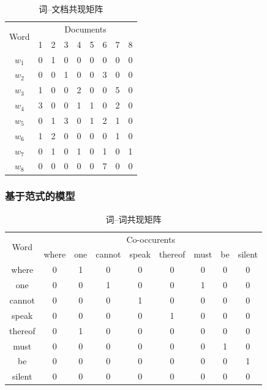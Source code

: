 \begin{table}
  \setlength{\tabcolsep}{8pt}
  \centering
  \caption{词--文档共现矩阵\cite{Sahlgren2008}}
  \label{tab:word-doc}
  \begin{tabular}{|c|cccccccc|}
    \hline
    \multirow{2}{*}{Word} & \multicolumn{8}{c|}{Documents} \\
                          & 1 & 2 & 3 & 4 & 5 & 6 & 7 & 8  \\
    \hline
    $w_1$ & 0 & 1 & 0 & 0 & 0 & 0 & 0 & 0  \\
    $w_2$ & 0 & 0 & 1 & 0 & 0 & 3 & 0 & 0  \\
    $w_3$ & 1 & 0 & 0 & 2 & 0 & 0 & 5 & 0  \\
    $w_4$ & 3 & 0 & 0 & 1 & 1 & 0 & 2 & 0  \\
    $w_5$ & 0 & 1 & 3 & 0 & 1 & 2 & 1 & 0  \\
    $w_6$ & 1 & 2 & 0 & 0 & 0 & 0 & 1 & 0  \\
    $w_7$ & 0 & 1 & 0 & 1 & 0 & 1 & 0 & 1  \\
    $w_8$ & 0 & 0 & 0 & 0 & 0 & 7 & 0 & 0  \\
    \hline
  \end{tabular}
\end{table}

\subsubsection{基于范式的模型}
\begin{table}
  \centering
  \caption{词--词共现矩阵\cite{Sahlgren2008}}
  \label{tab:word-word}
  \begin{tabular}{|c|cccccccc|}
    \hline
    \multirow{2}{*}{Word} & \multicolumn{8}{c|}{Co-occurents} \\
                          & where & one & cannot & speak & thereof & must & be & silent  \\
    \hline
    where   & 0 & 1 & 0 & 0 & 0 & 0 & 0 & 0  \\
    one     & 0 & 0 & 1 & 0 & 0 & 1 & 0 & 0  \\
    cannot  & 0 & 0 & 0 & 1 & 0 & 0 & 0 & 0  \\
    speak   & 0 & 0 & 0 & 0 & 1 & 0 & 0 & 0  \\
    thereof & 0 & 1 & 0 & 0 & 0 & 0 & 0 & 0  \\
    must    & 0 & 0 & 0 & 0 & 0 & 0 & 1 & 0  \\
    be      & 0 & 0 & 0 & 0 & 0 & 0 & 0 & 1  \\
    silent  & 0 & 0 & 0 & 0 & 0 & 0 & 0 & 0  \\
    \hline
  \end{tabular}
\end{table}

